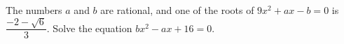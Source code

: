 The numbers $a$ and $b$ are rational, and one of the roots of $9x^2+ax-b=0$ is $\dfrac{-2-\sqrt6}{3}$. Solve the equation $bx^2-ax+16=0$.
